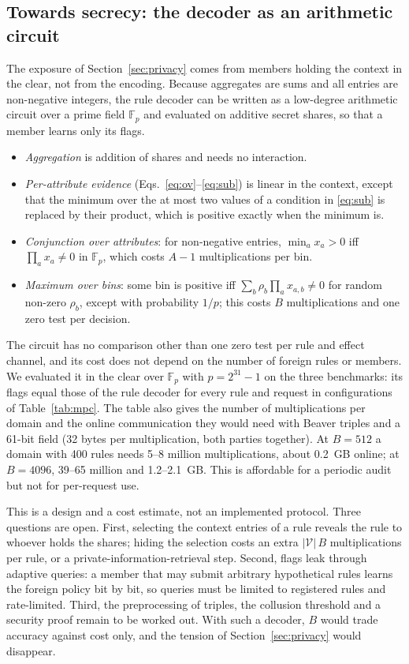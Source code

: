 \documentclass[preprint,12pt]{elsarticle}
\theoremstyle{definition}
\begin{document}
\subsection{Towards secrecy: the decoder as an arithmetic circuit}
\label{sec:mpc}
The exposure of Section~\ref{sec:privacy} comes from members holding the context in the clear, not from the encoding. Because aggregates are sums and all entries are non-negative integers, the rule decoder can be written as a low-degree arithmetic circuit over a prime field $\mathbb{F}_p$ and evaluated on additive secret shares, so that a member learns only its flags.
\begin{itemize}
\item \emph{Aggregation} is addition of shares and needs no interaction.
\item \emph{Per-attribute evidence} (Eqs.~\eqref{eq:ov}--\eqref{eq:sub}) is linear in the context, except that the minimum over the at most two values of a condition in \eqref{eq:sub} is replaced by their product, which is positive exactly when the minimum is.
\item \emph{Conjunction over attributes}: for non-negative entries, $\min_a x_a>0$ iff $\prod_a x_a\neq0$ in $\mathbb{F}_p$, which costs $A-1$ multiplications per bin.
\item \emph{Maximum over bins}: some bin is positive iff $\sum_b\rho_b\prod_a x_{a,b}\neq0$ for random non-zero $\rho_b$, except with probability $1/p$; this costs $B$ multiplications and one zero test per decision.
\end{itemize}
The circuit has no comparison other than one zero test per rule and effect channel, and its cost does not depend on the number of foreign rules or members. We evaluated it in the clear over $\mathbb{F}_p$ with $p=2^{31}-1$ on the three benchmarks: its flags equal those of the rule decoder for every rule and request in \rvagree{} configurations of Table~\ref{tab:mpc}. The table also gives the number of multiplications per domain and the online communication they would need with Beaver triples and a 61-bit field (32 bytes per multiplication, both parties together). At $B=512$ a domain with 400 rules needs 5--8 million multiplications, about 0.2~GB online; at $B=4096$, 39--65 million and 1.2--2.1~GB. This is affordable for a periodic audit but not for per-request use.

This is a design and a cost estimate, not an implemented protocol. Three questions are open. First, selecting the context entries of a rule reveals the rule to whoever holds the shares; hiding the selection costs an extra $|\mathcal{V}|\,B$ multiplications per rule, or a private-information-retrieval step. Second, flags leak through adaptive queries: a member that may submit arbitrary hypothetical rules learns the foreign policy bit by bit, so queries must be limited to registered rules and rate-limited. Third, the preprocessing of triples, the collusion threshold and a security proof remain to be worked out. With such a decoder, $B$ would trade accuracy against cost only, and the tension of Section~\ref{sec:privacy} would disappear.
\end{document}
